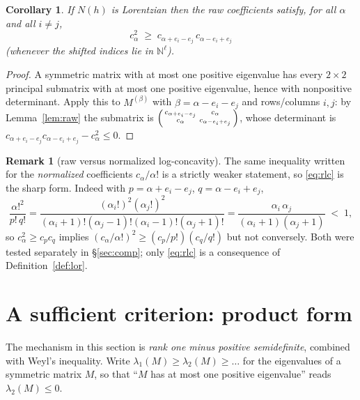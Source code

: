 \documentclass[11pt]{article}
\newtheorem{corollary}[theorem]{Corollary}
\theoremstyle{definition}
\newtheorem{remark}[theorem]{Remark}
\newcommand{\N}{\mathbb{N}}
\begin{document}
\begin{corollary}\label{cor:rlc}
If $N(h)$ is Lorentzian then the raw coefficients satisfy, for all $\alpha$ and all $i\ne j$,
\begin{equation}\label{eq:rlc}
  c_\alpha^2\;\ge\;c_{\alpha+e_i-e_j}\,c_{\alpha-e_i+e_j}
  \tag{RLC}
\end{equation}
(whenever the shifted indices lie in $\N^\ell$).
\end{corollary}

\begin{proof}
A symmetric matrix with at most one positive eigenvalue has every $2\times2$ principal
submatrix with at most one positive eigenvalue, hence with nonpositive determinant. Apply this
to $M^{(\beta)}$ with $\beta=\alpha-e_i-e_j$ and rows/columns $i,j$: by Lemma~\ref{lem:raw} the
submatrix is $\begin{psmallmatrix}c_{\alpha+e_i-e_j}&c_\alpha\\ c_\alpha&
c_{\alpha-e_i+e_j}\end{psmallmatrix}$, whose determinant is
$c_{\alpha+e_i-e_j}c_{\alpha-e_i+e_j}-c_\alpha^2\le0$.
\end{proof}

\begin{remark}[raw versus normalized log-concavity]\label{rem:rawvsnorm}
The same inequality written for the \emph{normalized} coefficients $c_\alpha/\alpha!$ is a
strictly weaker statement, so \eqref{eq:rlc} is the sharp form. Indeed with
$p=\alpha+e_i-e_j$, $q=\alpha-e_i+e_j$,
\[
  \frac{\alpha!^2}{p!\,q!}
  =\frac{(\alpha_i!)^2(\alpha_j!)^2}{(\alpha_i+1)!(\alpha_j-1)!(\alpha_i-1)!(\alpha_j+1)!}
  =\frac{\alpha_i\,\alpha_j}{(\alpha_i+1)(\alpha_j+1)}\;<\;1 ,
\]
so $c_\alpha^2\ge c_pc_q$ implies
$(c_\alpha/\alpha!)^2\ge (c_p/p!)(c_q/q!)$ but not conversely. Both were tested separately in
\S\ref{sec:comp}; only \eqref{eq:rlc} is a consequence of Definition~\ref{def:lor}.
\end{remark}

\section{A sufficient criterion: product form}

The mechanism in this section is \emph{rank one minus positive semidefinite}, combined with
Weyl's inequality. Write $\lambda_1(M)\ge\lambda_2(M)\ge\dots$ for the eigenvalues of a
symmetric matrix $M$, so that ``$M$ has at most one positive eigenvalue'' reads
$\lambda_2(M)\le0$.
\end{document}
